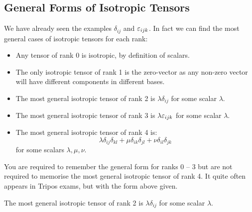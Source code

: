 \documentclass[../main.tex]{subfiles}
\begin{document}
\subsection{General Forms of Isotropic Tensors}
We have already seen the examples $\delta_{i j}$ and $\varepsilon_{i j k}$.
In fact we can find the most general cases of isotropic tensors for each rank:
\begin{itemize}
  \item Any tensor of rank 0 is isotropic, by definition of scalars.
  \item The only isotropic tensor of rank 1 is the zero-vector as any non-zero vector will have different components in different bases.
  \item The most general isotropic tensor of rank 2 is $\lambda \delta_{i j}$ for some scalar $\lambda$.
  \item The most general isotropic tensor of rank 3 is $\lambda \varepsilon_{i j k}$ for some scalar $\lambda$.
  \item The most general isotropic tensor of rank 4 is:
    \[
      \lambda \delta_{i j}\delta_{k l} + \mu \delta_{i k}\delta_{j l} + \nu\delta_{i l}\delta_{j k}
    \]
    for some scalars $\lambda, \mu, \nu$.
\end{itemize}
\begin{remark}[Exams]
  You are required to remember the general form for ranks 0 -- 3 but are not required to memorise the most general isotropic tensor of rank 4.
  It quite often appears in Tripos exams, but with the form above given.
\end{remark}
\begin{lemma}
  The most general isotropic tensor of rank 2 is $\lambda \delta_{i j}$ for some scalar $\lambda$. \label{general2ndRankIso}
\end{lemma}
\end{document}
